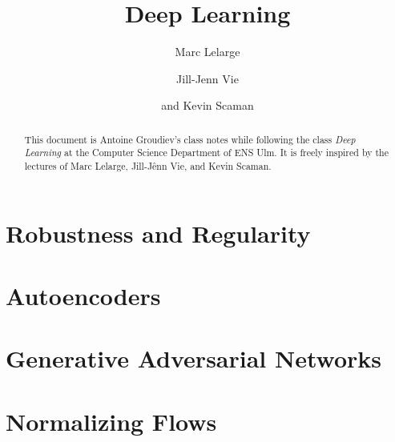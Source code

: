 \documentclass[toc, titlepaged]{../cs-classes/cs-classes}
\title{Deep Learning}
\author{Marc Lelarge\and Jill-Jenn Vie\and and Kevin Scaman}
\begin{document}
\begin{abstract}
    This document is Antoine Groudiev's class notes while following the class \emph{Deep Learning} at the Computer Science Department of ENS Ulm. It is freely inspired by the lectures of Marc Lelarge, Jill-Jênn Vie, and Kevin Scaman. 
\end{abstract}





% 




\section{Robustness and Regularity}



\section{Autoencoders}

\section{Generative Adversarial Networks}

\section{Normalizing Flows}
\end{document}
